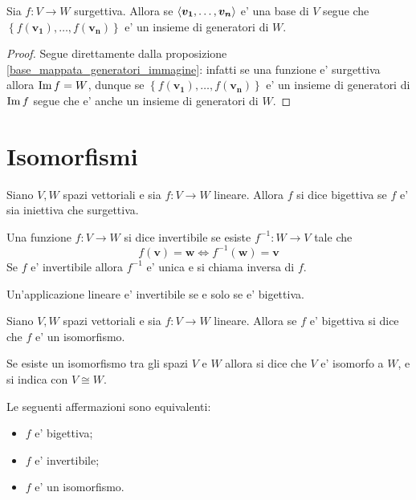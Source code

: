 \begin{corollary}\label{base_mappata_generatori_codominio}
    Sia $f : V \to W$ surgettiva. Allora se $\left\langle \bm{v_1}, \dots, \bm{v_n} \right\rangle$ e' una base di $V$ segue che $\left\{ f(\bm{v_1}), \dots, f(\bm{v_n})\right\}$ e' un insieme di generatori di $W$.
\end{corollary}
\begin{proof}
    Segue direttamente dalla proposizione \ref{base_mappata_generatori_immagine}: infatti se una funzione e' surgettiva allora $\operatorname{Im}f = W$, dunque se $\left\{ f(\bm{v_1}), \dots, f(\bm{v_n})\right\}$ e' un insieme di generatori di $\operatorname{Im}f$ segue che e' anche un insieme di generatori di $W$.
\end{proof}

\section{Isomorfismi}

\begin{definition}
    Siano $V, W$ spazi vettoriali e sia $f : V \to W$ lineare. Allora $f$ si dice bigettiva se $f$ e' sia iniettiva che surgettiva.
\end{definition}

\begin{definition}
    Una funzione $f : V \to W$ si dice invertibile se esiste $f^{-1} : W \to V$ tale che \begin{equation}
        f(\bm{v}) = \bm{w} \iff f^{-1}(\bm{w}) = \bm{v}
    \end{equation}
    Se $f$ e' invertibile allora $f^{-1}$ e' unica e si chiama inversa di $f$.
\end{definition}

\begin{remark}
    Un'applicazione lineare e' invertibile se e solo se e' bigettiva. 
\end{remark}

\begin{definition}
    Siano $V, W$ spazi vettoriali e sia $f : V \to W$ lineare. Allora se $f$ e' bigettiva si dice che $f$ e' un isomorfismo.
    
    Se esiste un isomorfismo tra gli spazi $V$ e $W$ allora si dice che $V$ e' isomorfo a $W$, e si indica con $V \cong W$.
\end{definition}

\begin{remark}
    Le seguenti affermazioni sono equivalenti:
    \begin{itemize}
        \item $f$ e' bigettiva;
        \item $f$ e' invertibile;
        \item $f$ e' un isomorfismo.
    \end{itemize}
\end{remark}

